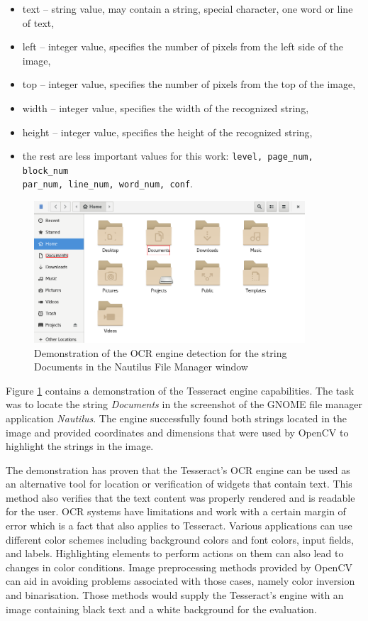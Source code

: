 \begin{itemize}
    \item text -- string value, may contain a string, special character, one word or line of text,
    \item left -- integer value, specifies the number of pixels from the left side of the image,
    \item top -- integer value, specifies the number of pixels from the top of the image,
    \item width -- integer value, specifies the width of the recognized string, 
    \item height -- integer value, specifies the height of the recognized string,
    \item the rest are less important values for this work: \verb|level, page_num, block_num| \\ \verb|par_num, line_num, word_num, conf|.
\end{itemize}

\begin{figure}[H]
	\centering
	\includegraphics[width=0.9\textwidth]{obrazky-figures/ocr+nautilus.png}
	\caption{Demonstration of the OCR engine detection for the string Documents in the Nautilus File Manager window}
	\label{ocr_nautilus}
\end{figure}

Figure \ref{ocr_nautilus} contains a demonstration of the Tesseract engine capabilities. The task was to locate the string \textit{Documents} in the screenshot of the GNOME file manager application \textit{Nautilus}. The engine successfully found both strings located in the image and provided coordinates and dimensions that were used by OpenCV to highlight the strings in the image. 

The demonstration has proven that the Tesseract's OCR engine can be used as an alternative tool for location or verification of widgets that contain text. This method also verifies that the text content was properly rendered and is readable for the user. OCR systems have limitations and work with a certain margin of error which is a fact that also applies to Tesseract. Various applications can use different color schemes including background colors and font colors, input fields, and labels. Highlighting elements to perform actions on them can also lead to changes in color conditions. Image preprocessing methods provided by OpenCV can aid in avoiding problems associated with those cases, namely color inversion and binarisation. Those methods would supply the Tesseract's engine with an image containing black text and a white background for the evaluation.

